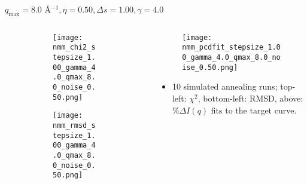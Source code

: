 \documentclass{beamer}
\begin{document}
\begin{frame}{$ q_{\textrm{max}}=8.0 $ \AA $^{-1}, \eta=0.50, \Delta s=1.00, \gamma=4.0$}
	\begin{columns}
		\begin{column}{.5\textwidth}
			\begin{figure}[H]
			\centering
			\begin{subfigure}[b]{\textwidth}
				\centering
				\texttt{[image: nmm\_chi2\_stepsize\_1.00\_gamma\_4.0\_qmax\_8.0\_noise\_0.50.png]}
				\label{fig:}
			\end{subfigure}
			\begin{subfigure}[b]{\textwidth}
				\centering
				\texttt{[image: nmm\_rmsd\_stepsize\_1.00\_gamma\_4.0\_qmax\_8.0\_noise\_0.50.png]}
				\label{fig:}
			\end{subfigure}
			\end{figure}
		\end{column}
		\begin{column}{.5\textwidth}
			\begin{figure}[H]
				\centering
				\texttt{[image: nmm\_pcdfit\_stepsize\_1.00\_gamma\_4.0\_qmax\_8.0\_noise\_0.50.png]}
				\label{fig:}
			\end{figure}
			\begin{itemize}
				\item 10 simulated annealing runs; top-left: $\chi^2$, bottom-left: RMSD, above: $\%\Delta I(q)$ fits to the target curve.
			\end{itemize}
		\end{column}
	\end{columns}
\end{frame}
 
\end{document}
